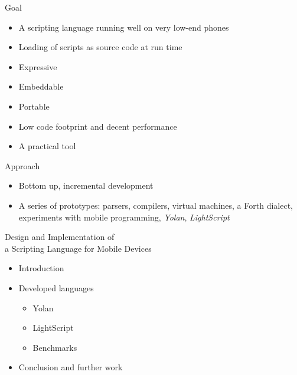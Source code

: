 \documentclass[a4paper,landscape]{slides}
\begin{document}
\begin{slide}
	{\large 
            Goal
	\\ \mbox{}}
	\begin{itemize} \setlength{\itemsep}{2mm}
            \item A scripting language running well on very low-end phones
            \item Loading of scripts as source code at run time
            \item Expressive
            \item Embeddable
            \item Portable
            \item Low code footprint and decent performance
            \item A practical tool
	\end{itemize}
\end{slide}
\begin{slide}
	{\large 
            Approach
	\\ \mbox{}}
	\begin{itemize} \setlength{\itemsep}{5mm}
            \item Bottom up, incremental development
            \item A series of prototypes: parsers, compilers, virtual machines, a Forth dialect, experiments with mobile programming, \emph{Yolan}, \emph{LightScript}
	\end{itemize}
\end{slide}



\begin{slide}
        {\large Design and Implementation of \\ a Scripting Language for Mobile Devices \\ \mbox{}}
\begin{itemize}\addtolength{\itemsep}{-\baselineskip}
\item Introduction 
\item Developed languages 
        \begin{itemize}
            \item Yolan 
            \item LightScript 
            \item Benchmarks 
        \end{itemize}
\item Conclusion and further work 
\end{itemize}
\end{slide}
\end{document}
